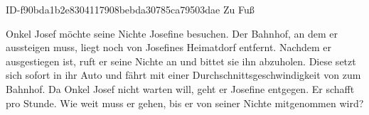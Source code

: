 \begin{exercise}
      {ID-f90bda1b2e8304117908bebda30785ca79503dae}
      {Zu Fuß}
  \ifproblem\problem\par
    Onkel Josef möchte seine Nichte Josefine besuchen.
    Der Bahnhof, an dem er aussteigen muss, liegt noch  von Josefines
    Heimatdorf entfernt. Nachdem er ausgestiegen ist, ruft er seine Nichte an und
    bittet sie ihn abzuholen. Diese setzt sich sofort in ihr Auto und fährt mit einer
    Durchschnittsgeschwindigkeit von  zum Bahnhof. Da Onkel Josef nicht
    warten will, geht er Josefine entgegen. Er schafft  pro Stunde. Wie
    weit muss er gehen, bis er von seiner Nichte mitgenommen wird?
  \fi
\end{exercise}
